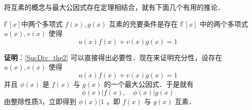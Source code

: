 将互素的概念与最大公因式存在定理相结合，就有下面几个有用的推论．
\begin{theorem}{}
$\mathbb{F}[x]$中两个多项式 $f(x),g(x)$ 互素的充要条件是存在 $\mathbb{F}[x]$ 中的两个多项式 $u(x),v(x)$ 使得
\begin{equation}
u(x)f(x)+v(x)g(x)=1
\end{equation}
\end{theorem}
\textbf{证明}：\autoref{SucDiv_the2} 可以直接得出必要性．现在来证明充分性，设存在 $u(x),v(x)$ 使得 
\begin{equation}
u(x)f(x)+v(x)g(x)=1
\end{equation}
并且 $\phi(x)$ 是 $f(x)$ 与 $g(x)$ 的一个最大公因式．于是就有
\begin{equation}
\phi(x)|f(x),\quad \phi(x)|g(x)
\end{equation}
由整除性质3，立即得到 $\phi(x)|1$ ，即 $f(x)$ 与 $g(x)$ 互素．